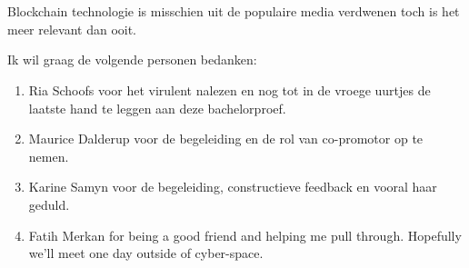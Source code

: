 
\chapter*{}
\label{ch:voorwoord}

Blockchain technologie is misschien uit de populaire media verdwenen toch is het meer relevant dan ooit. 

Ik wil graag de volgende personen bedanken:

\begin{enumerate}
\item Ria Schoofs voor het virulent nalezen en nog tot in de vroege uurtjes de laatste hand te leggen aan deze bachelorproef.
\item Maurice Dalderup voor de begeleiding en de rol van co-promotor op te nemen.
\item Karine Samyn voor de begeleiding, constructieve feedback en vooral haar geduld.
\item Fatih Merkan for being a good friend and helping me pull through. Hopefully we'll meet one day outside of cyber-space. 
\end{enumerate}
